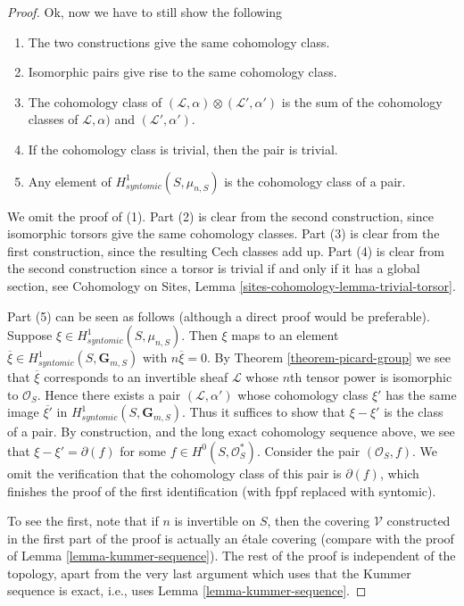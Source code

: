 \begin{proof}
\medskip\noindent
Ok, now we have to still show the following
\begin{enumerate}
\item The two constructions give the same cohomology class.
\item Isomorphic pairs give rise to the same cohomology class.
\item The cohomology class of
$(\mathcal{L}, \alpha) \otimes (\mathcal{L}', \alpha')$
is the sum of the cohomology classes of
$\mathcal{L}, \alpha)$ and $(\mathcal{L}', \alpha')$.
\item If the cohomology class is trivial, then the pair is trivial.
\item Any element of $H^1_{syntomic}(S, \mu_{n, S})$ is the
cohomology class of a pair.
\end{enumerate}
We omit the proof of (1). Part (2) is clear from the second construction,
since isomorphic torsors give the same cohomology classes.
Part (3) is clear from the first construction, since the resulting
Cech classes add up. Part (4) is clear from the second construction
since a torsor is trivial if and only if it has a global section, see
Cohomology on Sites, Lemma \ref{sites-cohomology-lemma-trivial-torsor}.

\medskip\noindent
Part (5) can be seen as follows (although a direct proof would be
preferable). Suppose $\xi \in H^1_{syntomic}(S, \mu_{n, S})$.
Then $\xi$ maps to an element
$\overline{\xi} \in H^1_{syntomic}(S, \mathbf{G}_{m, S})$
with $n \overline{\xi} = 0$. By
Theorem \ref{theorem-picard-group}
we see that $\overline{\xi}$ corresponds to an invertible sheaf $\mathcal{L}$
whose $n$th tensor power is isomorphic to $\mathcal{O}_S$.
Hence there exists a pair $(\mathcal{L}, \alpha')$ whose cohomology
class $\xi'$ has the same image $\overline{\xi'}$ in
$H^1_{syntomic}(S, \mathbf{G}_{m, S})$. Thus it suffices to show
that $\xi - \xi'$ is the class of a pair. By construction, and the
long exact cohomology sequence above, we see that
$\xi - \xi' = \partial(f)$ for some $f \in H^0(S, \mathcal{O}_S^*)$.
Consider the pair $(\mathcal{O}_S, f)$. We omit the verification
that the cohomology class of this pair is $\partial(f)$, which
finishes the proof of the first identification (with fppf replaced
with syntomic).

\medskip\noindent
To see the first, note that if $n$ is invertible on $S$, then the
covering $\mathcal{V}$ constructed in the first part of the proof
is actually an \'etale covering (compare with the proof of
Lemma \ref{lemma-kummer-sequence}). The rest of the proof is independent
of the topology, apart from the very last argument which uses that
the Kummer sequence is exact, i.e., uses Lemma \ref{lemma-kummer-sequence}.
\end{proof}







